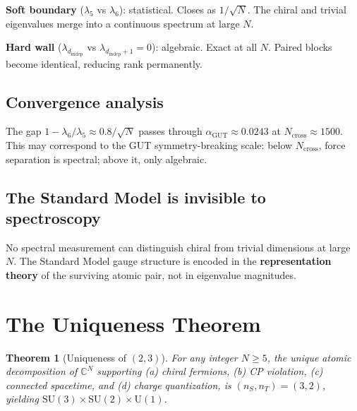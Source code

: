\documentclass[12pt]{article}
\newtheorem{theorem}{Theorem}[section]
\theoremstyle{remark}
\begin{document}
\textbf{Soft boundary} ($\lambda_5$ vs $\lambda_6$): statistical. Closes as $1/\sqrt{N}$. The chiral and trivial eigenvalues merge into a continuous spectrum at large $N$.

\textbf{Hard wall} ($\lambda_{d_\text{indep}}$ vs $\lambda_{d_\text{indep}+1} = 0$): algebraic. Exact at all $N$. Paired blocks become identical, reducing rank permanently.

\subsection{Convergence analysis}

The gap $1 - \lambda_6/\lambda_5 \approx 0.8/\sqrt{N}$ passes through $\alpha_\text{GUT} \approx 0.0243$ at $N_\text{cross} \approx 1500$. This may correspond to the GUT symmetry-breaking scale: below $N_\text{cross}$, force separation is spectral; above it, only algebraic.

\subsection{The Standard Model is invisible to spectroscopy}

No spectral measurement can distinguish chiral from trivial dimensions at large $N$. The Standard Model gauge structure is encoded in the \textbf{representation theory} of the surviving atomic pair, not in eigenvalue magnitudes.

\section{The Uniqueness Theorem}

\begin{theorem}[Uniqueness of $(2,3)$]
For any integer $N \geq 5$, the unique atomic decomposition of $\mathbb{C}^N$ supporting (a) chiral fermions, (b) CP violation, (c) connected spacetime, and (d) charge quantization, is $(n_S, n_T) = (3, 2)$, yielding $\text{SU}(3)\times\text{SU}(2)\times\text{U}(1)$.
\end{theorem}
\end{document}
